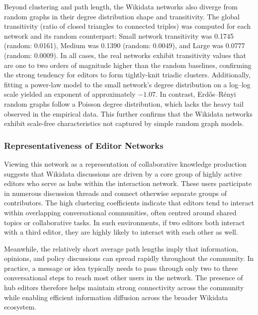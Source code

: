 \documentclass[conference]{IEEEtran}
\begin{document}
Beyond clustering and path length, the Wikidata networks also diverge from random graphs in their degree distribution shape and transitivity. The global transitivity (ratio of closed triangles to connected triples) was computed for each network and its random counterpart: Small network transitivity was 0.1745 (random: 0.0161), Medium was 0.1390 (random: 0.0049), and Large was 0.0777 (random: 0.0009). In all cases, the real networks exhibit transitivity values that are one to two orders of magnitude higher than the random baselines, confirming the strong tendency for editors to form tightly-knit triadic clusters. Additionally, fitting a power-law model to the small network's degree distribution on a log--log scale yielded an exponent of approximately $-1.07$. In contrast, Erd\H{o}s--R\'{e}nyi random graphs follow a Poisson degree distribution, which lacks the heavy tail observed in the empirical data. This further confirms that the Wikidata networks exhibit scale-free characteristics not captured by simple random graph models.

\subsubsection{Representativeness of Editor Networks}
Viewing this network as a representation of collaborative knowledge production suggests that Wikidata discussions are driven by a core group of highly active editors who serve as hubs within the interaction network. These users participate in numerous discussion threads and connect otherwise separate groups of contributors. The high clustering coefficients indicate that editors tend to interact within overlapping conversational communities, often centred around shared topics or collaborative tasks. In such environments, if two editors both interact with a third editor, they are highly likely to interact with each other as well. 

Meanwhile, the relatively short average path lengths imply that information, opinions, and policy discussions can spread rapidly throughout the community. In practice, a message or idea typically needs to pass through only two to three conversational steps to reach most other users in the network. The presence of hub editors therefore helps maintain strong connectivity across the community while enabling efficient information diffusion across the broader Wikidata ecosystem.
\end{document}
